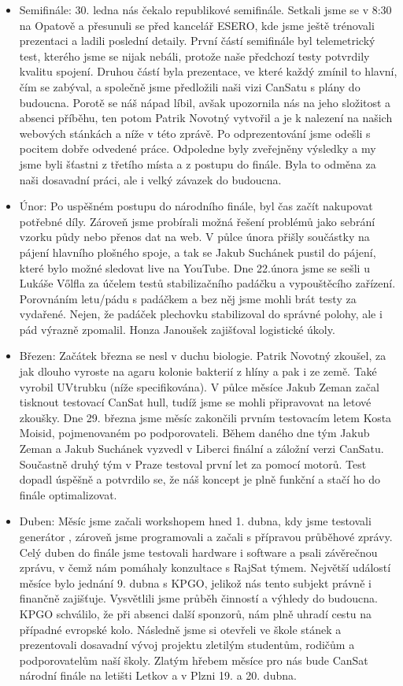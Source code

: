 \documentclass[a4paper]{report}
\begin{document}
\begin{itemize}
\item Semifinále: 30. ledna nás čekalo republikové semifinále. Setkali jsme se v 8:30 na Opatově a přesunuli se před kancelář ESERO, kde jsme ještě trénovali prezentaci a ladili poslední detaily. První částí semifinále byl telemetrický test, kterého jsme se nijak nebáli, protože naše předchozí testy potvrdily kvalitu spojení. Druhou částí byla prezentace, ve které každý zmínil to hlavní, čím se zabýval, a společně jsme předložili naši vizi CanSatu s plány do budoucna. Porotě se náš nápad líbil, avšak  upozornila nás na jeho složitost a absenci příběhu, ten potom Patrik Novotný vytvořil a je k nalezení na našich webových stánkách a níže v této zprávě. Po odprezentování jsme odešli s pocitem dobře odvedené práce. Odpoledne byly zveřejněny výsledky a my jsme byli šťastni z třetího místa a z postupu do finále. Byla to odměna za naši dosavadní práci, ale i velký závazek do budoucna.
\item Únor: Po uspěšném postupu do národního finále, byl čas začít nakupovat potřebné díly. Zároveň jsme probírali možná řešení problémů jako sebrání vzorku půdy nebo přenos dat na web. V půlce února přišly součástky na pájení hlavního plošného spoje, a tak se Jakub Suchánek pustil do pájení, které bylo možné sledovat live na YouTube. Dne 22.února jsme se sešli u Lukáše Vőlfla za účelem testů stabilizačního padáčku a vypouštěcího zařízení. Porovnáním letu/pádu s padáčkem a bez něj jsme mohli brát testy za vydařené. Nejen, že padáček plechovku stabilizoval do správné polohy, ale i pád výrazně zpomalil. Honza Janoušek zajišťoval logistické úkoly.
\item Březen: Začátek března se nesl v duchu biologie. Patrik Novotný zkoušel, za jak dlouho vyroste na agaru kolonie bakterií z hlíny a pak i ze země. Také vyrobil UVtrubku (níže specifikována).  V půlce měsíce Jakub Zeman začal tisknout testovací CanSat hull, tudíž jsme se mohli připravovat na letové zkoušky. Dne 29. března jsme měsíc zakončili prvním testovacím letem Kosta Moisid, pojmenovaném po podporovateli. Během daného dne tým Jakub Zeman a Jakub Suchánek vyzvedl v Liberci finální a záložní verzi CanSatu. Součastně druhý tým v Praze testoval první let za pomocí motorů. Test dopadl úspěšně a potvrdilo se, že náš koncept je plně funkční a stačí ho do finále optimalizovat.
\item Duben: Měsíc jsme začali workshopem hned 1. dubna, kdy jsme testovali generátor , zároveň jsme programovali a začali s přípravou průběhové zprávy. Celý duben do finále jsme testovali hardware i software a psali závěrečnou zprávu, v čemž nám pomáhaly konzultace s RajSat týmem. Největší událostí měsíce bylo jednání 9. dubna s KPGO, jelikož nás tento subjekt právně i finančně zajišťuje. Vysvětlili jsme průběh činností a výhledy do budoucna. KPGO schválilo, že při absenci další sponzorů, nám plně uhradí cestu na případné evropské kolo. Následně jsme si otevřeli ve škole stánek a prezentovali dosavadní vývoj projektu zletilým studentům, rodičům a podporovatelům naší školy. Zlatým hřebem měsíce pro nás bude CanSat národní finále na letišti Letkov a v Plzni 19. a 20. dubna. 
\end{itemize}
\end{document}
